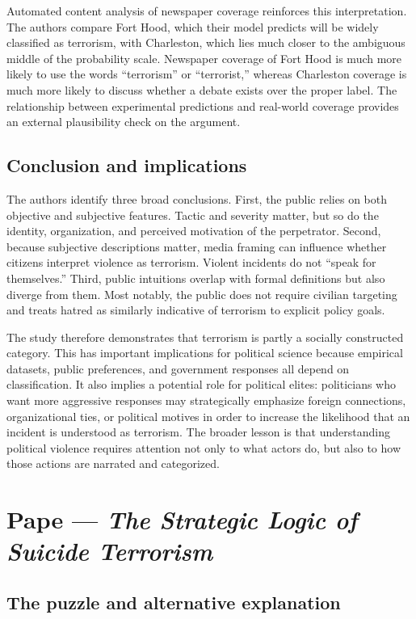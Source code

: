 Automated content analysis of newspaper coverage reinforces this interpretation. The authors compare Fort Hood, which their model predicts will be widely classified as terrorism, with Charleston, which lies much closer to the ambiguous middle of the probability scale. Newspaper coverage of Fort Hood is much more likely to use the words ``terrorism'' or ``terrorist,'' whereas Charleston coverage is much more likely to discuss whether a debate exists over the proper label. The relationship between experimental predictions and real-world coverage provides an external plausibility check on the argument.

\subsection{Conclusion and implications}

The authors identify three broad conclusions. First, the public relies on both objective and subjective features. Tactic and severity matter, but so do the identity, organization, and perceived motivation of the perpetrator. Second, because subjective descriptions matter, media framing can influence whether citizens interpret violence as terrorism. Violent incidents do not ``speak for themselves.'' Third, public intuitions overlap with formal definitions but also diverge from them. Most notably, the public does not require civilian targeting and treats hatred as similarly indicative of terrorism to explicit policy goals.

The study therefore demonstrates that terrorism is partly a socially constructed category. This has important implications for political science because empirical datasets, public preferences, and government responses all depend on classification. It also implies a potential role for political elites: politicians who want more aggressive responses may strategically emphasize foreign connections, organizational ties, or political motives in order to increase the likelihood that an incident is understood as terrorism. The broader lesson is that understanding political violence requires attention not only to what actors do, but also to how those actions are narrated and categorized.


\clearpage
\section{Pape --- \textit{The Strategic Logic of Suicide Terrorism}}

\subsection{The puzzle and alternative explanation}

